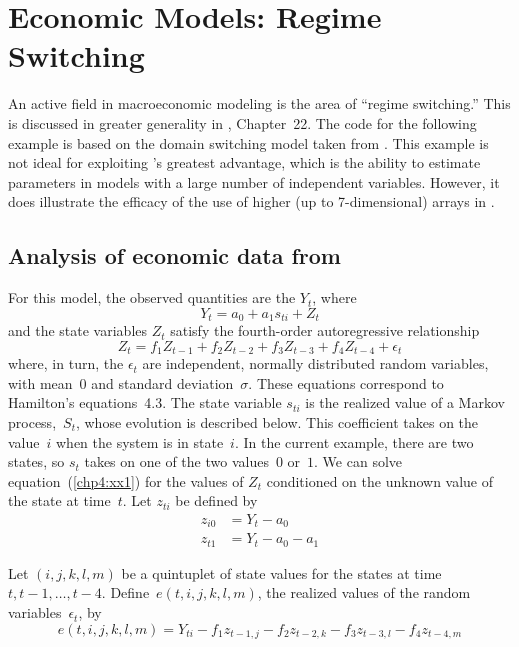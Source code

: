 \documentclass{admbmanual}
\begin{document}

\chapter{Economic Models: Regime Switching}\label{ch:regime-switching}

An active field in macroeconomic modeling is the area of ``regime switching.''
This is discussed in greater generality in \cite{hamilton1994}, Chapter~22. The
code for the following example is based on the domain switching model taken from
\cite{hamilton1989}. This example is not ideal for exploiting \ADM's greatest
advantage, which is the ability to estimate parameters in models with a large
number of independent variables. However, it does illustrate the efficacy of the
use of higher (up to 7-dimensional) arrays in \ADM.

\section{Analysis of economic data from \cite{hamilton1989}}

For this model, the observed quantities are the $Y_t$, where
\begin{equation}
 {
Y_t=a_0+a_1s_{ti}+Z_t}
\label{chp4:xx1}
\end{equation}
and the state variables $Z_t$ satisfy the fourth-order autoregressive
relationship
\begin{equation}
  {
Z_t=f_1Z_{t-1}+f_2Z_{t-2}+f_3Z_{t-3}+f_4Z_{t-4}+
  \epsilon_t }
\label{chp4:xx2}
\end{equation}
where, in turn, the $\epsilon_t$ are independent, normally distributed random
variables, with mean~$0$ and standard deviation~$\sigma$. These equations
correspond to Hamilton's \cite{hamilton1989} equations~4.3. The state variable
$s_{ti}$ is the realized value of a Markov process,~$S_t$, whose evolution is
described below. This coefficient takes on the value~$i$ when the system is in
state~$i$. In the current example, there are two states, so $s_t$ takes on one
of the two values~$0$ or~$1$. We can solve
equation~(\ref{chp4:xx1}) %
for the values of $Z_t$ conditioned on the unknown value of the state at
time~$t$. Let $z_{ti}$ be defined by
\begin{align*}
  z_{i0}&=Y_t-a_0\\
  z_{t1}&=Y_t-a_0-a_1
\end{align*}

Let $(i,j,k,l,m)$ be a quintuplet of state values for the states at time
$t,t-1,\ldots,t-4$. Define~$e(t,i,j,k,l,m)$, the realized values of the random
variables~$\epsilon_t$, by
$$e(t,i,j,k,l,m)=
Y_{ti}-f_1z_{t-1,j}-f_2z_{t-2,k}
-f_3z_{t-3,l}-f_4z_{t-4,m}$$
\end{document}
